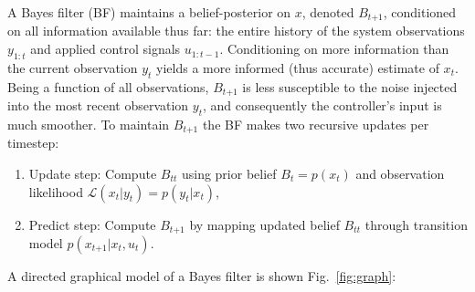 \documentclass[9pt]{article}
\newcommand{\now}[1]{#1_t}                  %
\newcommand{\new}[1]{#1_{t\mathord{+}1}}    %
\newcommand{\pno}[1]{#1_{t}}  %
\newcommand{\uno}[1]{#1_{tt}}              %
\newcommand{\pne}[1]{#1_{t\mathord{+}1}}   %
\begin{document}
A Bayes filter (BF) maintains a belief-posterior on $x$, denoted $\pne{B}$,
conditioned on all information available thus far:
the entire history of the system observations $y_{1:t}$ and applied control signals $u_{1:t-1}$.
Conditioning on more information than the current observation $\now{y}$ yields a more informed
(thus accurate) estimate of $\now{x}$.
Being a function of all observations,
$\pne{B}$ is less susceptible to the noise injected into the most recent observation $\now{y}$,
and consequently the controller's input is much smoother.
To maintain $\pne{B}$ the BF makes two recursive updates per timestep:
\begin{enumerate}
 \item Update step:
 Compute $\uno{B}$ using prior belief $\pno{B} = p(\now{x})$ and observation likelihood
 $\mathcal{L}(\now{x}|\now{y}) = p(\now{y}|\now{x})$,
 \item Predict step:
 Compute $\pne{B}$ by mapping updated belief $\uno{B}$ through transition model
 $p(\new{x}|\now{x},\now{u})$.
\end{enumerate}
A directed graphical model of a Bayes filter is shown Fig.~\ref{fig:graph}:
%
\end{document}
